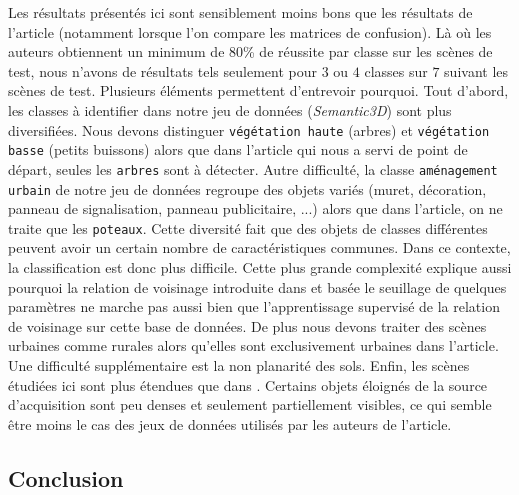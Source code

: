 \documentclass[a4paper, onecolumn, 11pt]{article}
\begin{document}
Les résultats présentés ici sont sensiblement moins bons que les résultats de l'article \cite{aka_article} (notamment lorsque l'on compare les matrices de confusion). Là où les auteurs obtiennent un minimum de $80$\% de réussite par classe sur les scènes de test, nous n'avons de résultats tels seulement pour $3$ ou $4$ classes sur $7$ suivant les scènes de test. Plusieurs éléments permettent d'entrevoir pourquoi. Tout d'abord, les classes à identifier dans notre jeu de données (\emph{Semantic3D}) sont plus diversifiées. Nous devons distinguer \texttt{végétation haute} (arbres) et \texttt{végétation basse} (petits buissons) alors que dans l'article qui nous a servi de point de départ, seules les \texttt{arbres} sont à détecter. Autre difficulté, la classe \texttt{aménagement urbain} de notre jeu de données regroupe des objets variés (muret, décoration, panneau de signalisation, panneau publicitaire,  ...) alors que dans l'article, on ne traite que les \texttt{poteaux}. Cette diversité fait que des objets de classes différentes peuvent avoir un certain nombre de caractéristiques communes. Dans ce contexte, la classification est donc plus difficile. Cette plus grande complexité explique aussi pourquoi la relation de voisinage introduite dans \cite{aka_article} et basée le seuillage de quelques paramètres ne marche pas aussi bien que l'apprentissage supervisé de la relation de voisinage sur cette base de données. De plus nous devons traiter des scènes urbaines comme rurales alors qu'elles sont exclusivement urbaines dans l'article. Une difficulté supplémentaire est la non planarité des sols. Enfin, les scènes étudiées ici sont plus étendues que dans \cite{aka_article}. Certains objets éloignés de la source d'acquisition sont peu denses et seulement partiellement visibles, ce qui semble être moins le cas des jeux de données utilisés par les auteurs de l'article.

\subsection{Conclusion}
\end{document}
